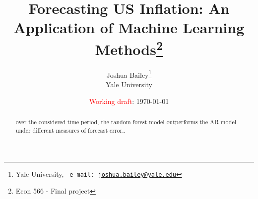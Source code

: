
\begin{titlepage}

\title{Forecasting US Inflation: An Application of Machine Learning Methods\footnote{Econ 566 - Final project}} 
\author{Joshua Bailey\thanks{Yale University, \texttt{\ e-mail:  \href{mailto: joshua.bailey@yale.edu}{joshua.bailey@yale.edu}}
}
\\ 
\normalsize{Yale University}
}


\date{\textcolor{red}{Working draft}: \today}
\maketitle
\vspace{-20pt}
\begin{abstract}
\begin{adjustwidth}{-15pt}{-15pt}
\thispagestyle{empty}

\noindent over the considered time period, the random forest model outperforms the AR model under different measures of forecast error.. \\[1pt]

\end{adjustwidth}
\end{abstract}



\end{titlepage}


\pagebreak

\hypersetup{linkcolor=black}
\tableofcontents
\listoffigures
\listoftables
\hypersetup{linkcolor=blue}


 